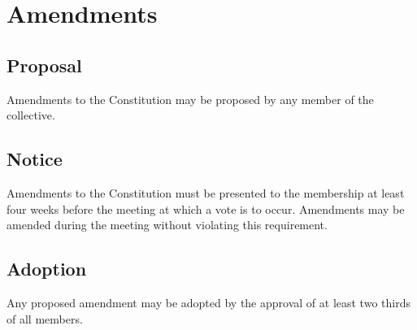\chapter{Amendments}

\section{Proposal}\label{sec:proposal}
Amendments to the Constitution may be proposed by any member of the collective.

\section{Notice}\label{sec:notice}
Amendments to the Constitution must be presented to the membership at least four weeks before the meeting at which a vote is to occur. Amendments may be amended during the meeting without violating this requirement.

\section{Adoption}\label{sec:adoption}
Any proposed amendment may be adopted by the approval of at least two thirds of all members.
